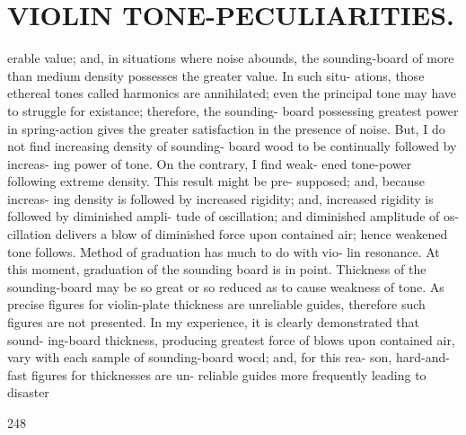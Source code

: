 \documentclass{article}
\begin{document}
\section*{VIOLIN TONE-PECULIARITIES.}
erable value; and, in situations where noise abounds, the sounding-board of more than medium density possesses the greater value. In such situ- ations, those ethereal tones called harmonics are annihilated; even the principal tone may have to struggle for existance; therefore, the sounding- board possessing greatest power in spring-action gives the greater satisfaction in the presence of noise. But, I do not find increasing density of sounding- board wood to be continually followed by increas- ing power of tone. On the contrary, I find weak- ened tone-power following extreme density. This result might be pre- supposed; and, because increas- ing density is followed by increased rigidity; and, increased rigidity is followed by diminished ampli- tude of oscillation; and diminished amplitude of os- cillation delivers a blow of diminished force upon contained air; hence weakened tone follows. Method of graduation has much to do with vio- lin resonance. At this moment, graduation of the sounding board is in point. Thickness of the sounding-board may be so great or so reduced as to cause weakness of tone. As precise figures for violin-plate thickness are unreliable guides, therefore such figures are not presented. In my experience, it is clearly demonstrated that sound- ing-board thickness, producing greatest force of blows upon contained air, vary with each sample of sounding-board wocd; and, for this rea- son, hard-and-fast figures for thicknesses are un- reliable guides more frequently leading to disaster

248
\end{document}
